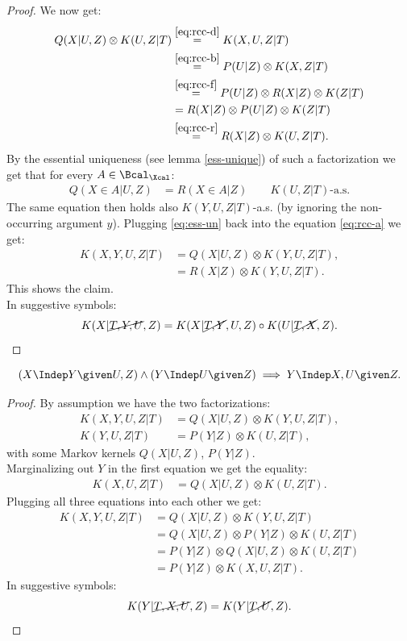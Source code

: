 \begin{Lem}
\begin{proof}
    We now get:
    \begin{align}
        Q(X|U,Z) \otimes K(U,Z|T) 
        & \stackrel{\ref{eq:rcc-d}}{=}  K(X,U,Z|T) \\
        & \stackrel{\ref{eq:rcc-b}}{=} P(U|Z) \otimes K(X,Z|T) \\
        &\stackrel{\ref{eq:rcc-f}}{=} P(U|Z) \otimes R(X|Z) \otimes K(Z|T) \\
        &=  R(X|Z)  \otimes P(U|Z) \otimes K(Z|T) \\
        &\stackrel{\ref{eq:rcc-r}}{=} R(X|Z)  \otimes  K(U,Z|T).
    \end{align}
    By the essential uniqueness (see lemma \ref{ess-unique}) of such a factorization we get that for every $A \in \Bcal_\Xcal$:
    \begin{align}
        Q(X \in A|U,Z) &= R(X \in A|Z) \qquad K(U,Z|T)\text{-a.s.}  \label{eq:ess-un}
    \end{align}
The same equation then holds also $K(Y,U,Z|T)$-a.s. (by ignoring the non-occurring argument $y$).
Plugging \ref{eq:ess-un} back into the equation \ref{eq:rcc-a} we get:
    \begin{align}
        K(X,Y,U,Z|T) & = Q(X|U,Z) \otimes K(Y,U,Z|T),\\
                     & = R(X|Z)  \otimes K(Y,U,Z|T).
    \end{align}
This shows the claim.\\
In suggestive symbols:
\[ K(X|\cancel{T,Y,U},Z) = K(X|\cancel{T,Y},U,Z) \circ K(U|\cancel{T,X},Z).\]
\end{proof}
\end{Lem}

\begin{Lem}
    \[ (X \Indep  Y \given U , Z) \land (Y \Indep  U \given Z) \implies Y \Indep  X , U \given Z.\]
\begin{proof}
 By assumption we have the two factorizations:
    \begin{align*}
        K(X,Y,U,Z|T) & = Q(X|U,Z) \otimes K(Y,U,Z|T),\\
        K(Y,U,Z|T) & = P(Y|Z) \otimes K(U,Z|T),
    \end{align*}
     with some Markov kernels $Q(X|U,Z)$, $P(Y|Z)$.\\
     Marginalizing out $Y$ in the first equation we get the equality:
    \begin{align*}
        K(X,U,Z|T) & = Q(X|U,Z) \otimes K(U,Z|T).
    \end{align*}
Plugging all three equations into each other we get:
    \begin{align*}
        K(X,Y,U,Z|T) & = Q(X|U,Z) \otimes K(Y,U,Z|T)\\
                     & = Q(X|U,Z) \otimes  P(Y|Z) \otimes K(U,Z|T)\\
                     & = P(Y|Z) \otimes  Q(X|U,Z)   \otimes K(U,Z|T) \\
                     & =  P(Y|Z)  \otimes   K(X,U,Z|T).
    \end{align*}
In suggestive symbols:
\[ K(Y|\cancel{T,X,U},Z) = K(Y|\cancel{T,U},Z). \]
\end{proof}
\end{Lem}


